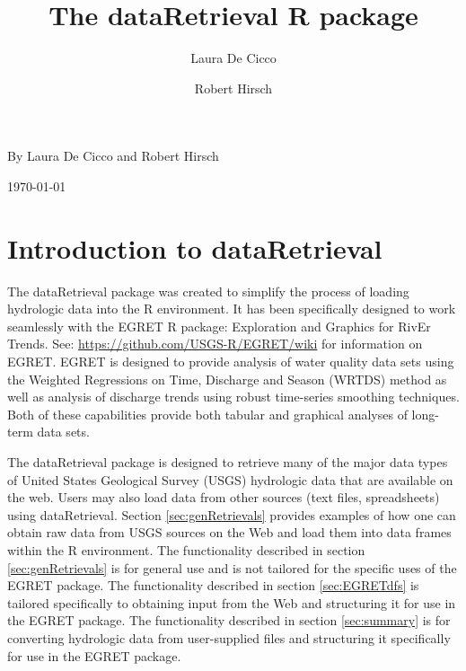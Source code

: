 \documentclass[a4paper,11pt]{article}\usepackage[]{graphicx}\usepackage[]{color}
\begin{document}
\renewenvironment{knitrout}{\begin{singlespace}}{\end{singlespace}}
\renewcommand*\listfigurename{Figures}

\renewcommand*\listtablename{Tables}


\title{The dataRetrieval R package}
\author[1]{Laura De Cicco}
\author[1]{Robert Hirsch}





\noindent\textsf{By Laura De Cicco and Robert Hirsch}

\noindent\textsf{\today}

% 

\tableofcontents
\listoffigures
\listoftables

\newpage

\section{Introduction to dataRetrieval}
The dataRetrieval package was created to simplify the process of loading hydrologic data into the R environment. It has been specifically designed to work seamlessly with the EGRET R package: Exploration and Graphics for RivEr Trends. See: \url{https://github.com/USGS-R/EGRET/wiki} for information on EGRET. EGRET is designed to provide analysis of water quality data sets using the Weighted Regressions on Time, Discharge and Season (WRTDS) method as well as analysis of discharge trends using robust time-series smoothing techniques.  Both of these capabilities provide both tabular and graphical analyses of long-term data sets.


The dataRetrieval package is designed to retrieve many of the major data types of United States Geological Survey (USGS) hydrologic data that are available on the web. Users may also load data from other sources (text files, spreadsheets) using dataRetrieval.  Section \ref{sec:genRetrievals} provides examples of how one can obtain raw data from USGS sources on the Web and load them into data frames within the R environment.  The functionality described in section \ref{sec:genRetrievals} is for general use and is not tailored for the specific uses of the EGRET package.  The functionality described in section \ref{sec:EGRETdfs} is tailored specifically to obtaining input from the Web and structuring it for use in the EGRET package.  The functionality described in section \ref{sec:summary} is for converting hydrologic data from user-supplied files and structuring it specifically for use in the EGRET package.
\end{document}
